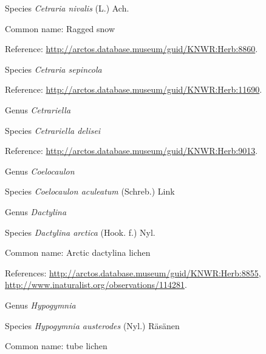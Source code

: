 \documentclass[9pt, article]{memoir}
\begin{document}
\begin{multicols}{2}
\vspace{6pt}\noindent\hspace{36pt}Species \textit{Cetraria nivalis} (L.) Ach.


Common name: Ragged snow

Reference: 
\url{http://arctos.database.museum/guid/KNWR:Herb:8860}.

\vspace{6pt}\noindent\hspace{36pt}Species \textit{Cetraria sepincola}


Reference: 
\url{http://arctos.database.museum/guid/KNWR:Herb:11690}.

\vspace{6pt}\noindent\hspace{30pt}Genus \textit{Cetrariella}


\vspace{6pt}\noindent\hspace{36pt}Species \textit{Cetrariella delisei}


Reference: 
\url{http://arctos.database.museum/guid/KNWR:Herb:9013}.

\vspace{6pt}\noindent\hspace{30pt}Genus \textit{Coelocaulon}


\vspace{6pt}\noindent\hspace{36pt}Species \textit{Coelocaulon aculeatum} (Schreb.) Link


\vspace{6pt}\noindent\hspace{30pt}Genus \textit{Dactylina}


\vspace{6pt}\noindent\hspace{36pt}Species \textit{Dactylina arctica} (Hook. f.) Nyl.


Common name: Arctic dactylina lichen

References: 
\url{http://arctos.database.museum/guid/KNWR:Herb:8855}, 
\url{http://www.inaturalist.org/observations/114281}.

\vspace{6pt}\noindent\hspace{30pt}Genus \textit{Hypogymnia}


\vspace{6pt}\noindent\hspace{36pt}Species \textit{Hypogymnia austerodes} (Nyl.) Räsänen


Common name: tube lichen


\end{multicols}
\end{document}
